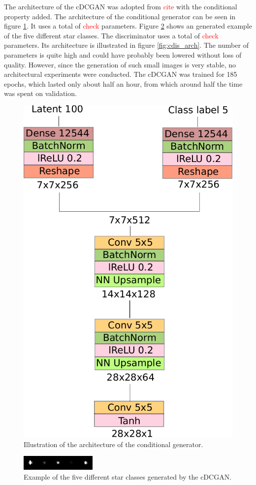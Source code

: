 \documentclass[10pt,conference,compsocconf]{IEEEtran}
\newcommand\TODO[1]{\textcolor{red}{#1}} %
\begin{document}
The architecture of the cDCGAN was adopted from \TODO{cite} with the conditional property added. The architecture of the conditional generator can be seen in figure \ref{fig:cgen_arch}. It uses a total of \TODO{check} parameters. Figure \ref{fig:clustered_generated_stars} shows an generated example of the five different star classes. The discriminator uses a total of \TODO{check} parameters. Its architecture is illustrated in figure \ref{fig:cdis_arch}. The number of parameters is quite high and could have probably been lowered without loss of quality. However, since the generation of such small images is very stable, no architectural experiments were conducted. The cDCGAN was trained for 185 epochs, which lasted only about half an hour, from which around half the time was spent on validation. 
\begin{figure}
    \centering
    \includegraphics[width=0.6\columnwidth]{assets/cgen_arch.pdf}
    \caption{Illustration of the architecture of the conditional generator.}
    \label{fig:cgen_arch}
\end{figure}
\begin{figure}
    \centering
    \includegraphics[width=\columnwidth]{assets/clustered_generated_stars.png}
    \caption{Example of the five different star classes generated by the cDCGAN.}
    \label{fig:clustered_generated_stars}
\end{figure}
\end{document}

